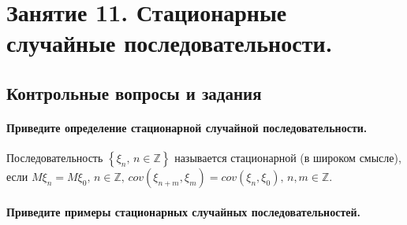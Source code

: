\chapter*{Занятие 11. Стационарные случайные последовательности.}

\section*{Контрольные вопросы и задания}

\subsubsection*{Приведите определение стационарной случайной последовательности.}

Последовательность $ \left\{ \xi_n, \, n \in \mathbb{Z} \right\} $ называется стационарной
(в широком смысле), если
$M \xi_n = M \xi_0, \, n \in \mathbb{Z}, \,
  cov \left( \xi_{n + m}, \xi_m \right) = cov \left( \xi_n, \xi_0 \right), \, n, m \in \mathbb{Z}.$

\subsubsection*{Приведите примеры стационарных случайных последовательностей.}

